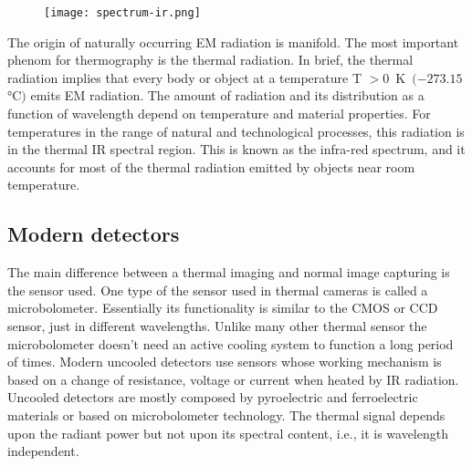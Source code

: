 %
%
\begin{figure}[!h]
	\centering
	\texttt{[image: spectrum-ir.png]}
	\label{fig:spectrum-ir}
\end{figure}
% 
\newline The origin of naturally occurring EM radiation is manifold. 
The most important phenom for thermography is the thermal radiation. 
In brief, the thermal radiation implies that every body or object at a
temperature T $>0 \,$ \si{\kelvin} $\,(-273.15 \,$\si{\celsius}$)$ emits EM
radiation. 
The amount of radiation and its distribution as a function of wavelength depend
on temperature and material properties.\cite{vollmer2017infrared}
For temperatures in the range of natural and technological processes, this 
radiation is in the thermal IR spectral region. 
This is known as the infra-red spectrum, and it accounts for most of the
thermal radiation emitted by objects near room temperature.
%
\subsection{Modern detectors}
\label{ssec:modern-detect}
The main difference between a thermal imaging and normal image capturing is the
sensor used. One type of the sensor used in thermal cameras is called a
microbolometer. Essentially its functionality is similar to the CMOS or CCD
sensor, just in different wavelengths. Unlike many other thermal sensor the
microbolometer doesn't need an active cooling system to function a long period
of times. Modern uncooled detectors use sensors whose working mechanism is based
on a change of resistance, voltage or current when heated by IR radiation.
Uncooled detectors are mostly composed by pyroelectric and ferroelectric
materials or based on microbolometer technology. The thermal signal depends upon
the radiant power but not upon its spectral content, i.e., it is wavelength
independent.\cite{10.1117/12.2266142,rogalski2000infrared}
